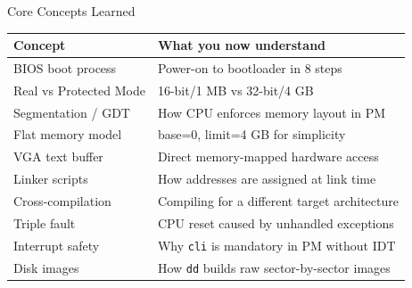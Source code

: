 \documentclass[aspectratio=169]{beamer}
\begin{document}
\begin{frame}{Core Concepts Learned}
  \begin{tabular}{ll}
    \toprule
    \textbf{Concept} & \textbf{What you now understand}\\
    \midrule
    BIOS boot process    & Power-on to bootloader in 8 steps\\
    Real vs Protected Mode& 16-bit/1 MB vs 32-bit/4 GB\\
    Segmentation / GDT   & How CPU enforces memory layout in PM\\
    Flat memory model    & base=0, limit=4 GB for simplicity\\
    VGA text buffer      & Direct memory-mapped hardware access\\
    Linker scripts       & How addresses are assigned at link time\\
    Cross-compilation    & Compiling for a different target architecture\\
    Triple fault         & CPU reset caused by unhandled exceptions\\
    Interrupt safety     & Why \texttt{cli} is mandatory in PM without IDT\\
    Disk images          & How \texttt{dd} builds raw sector-by-sector images\\
    \bottomrule
  \end{tabular}
\end{frame}
\end{document}
